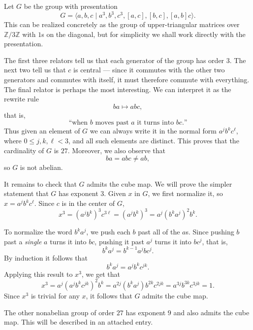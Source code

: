 \documentclass[12pt]{article}
\newcounter{123listctr}
\newcounter{123listcolonstylectr}
\begin{document}
Let $G$ be the group with presentation
\[
  G = \langle a, b, c \mid a^3, b^3, c^3, [a,c], [b,c], [a,b]c \rangle.
\]
This can be realized concretely as the group of upper-triangular
matrices over $\mathbb{Z}/3\mathbb{Z}$ with $1$s on the diagonal, but for
simplicity we shall work directly with the presentation.

The first three relators tell us that each generator of the group has
order $3$.  The next two tell us that $c$ is central --- since it
commutes with the other two generators and commutes with itself, it
must therefore commute with everything.  The final relator is perhaps
the most interesting.  We can interpret it as the rewrite rule
\[
  ba \mapsto abc,
\]
that is,
\[
  \text{``when $b$ moves past $a$ it turns into $bc$.''}
\]
Thus given an element of $G$ we can always write it in the normal form
$a^j b^k c^{\ell}$, where $0\le j, k, \ell<3$, and all such elements
are distinct.  This proves that the cardinality of $G$ is $27$.
Moreover, we also observe that
\[
  ba = abc \ne ab,
\]
so $G$ is not abelian.

It remains to check that $G$ admits the cube map.  We will prove the
simpler statement that $G$ has exponent $3$.  Given $x$ in $G$, we
first normalize it, so $x = a^j b^k c^{\ell}$.  Since $c$ is in the
center of $G$,
\[
  x^3 = (a^j b^k)^3 c^{3\ell} = (a^j b^k)^3 = a^j(b^k a^j)^2b^k.
\]

To normalize the word $b^k a^j$, we push each $b$ past all of the
$a$s.  Since pushing $b$ past a \emph{single} $a$ turns it into $bc$, pushing
it past $a^j$ turns it into $bc^j$, that is,
\[
  b^k a^j = b^{k-1} a^j b c^j.
\]
By induction it follows that
\[
  b^k a^j = a^j b^k c^{jk}.
\]
Applying this result to $x^3$, we get that
\[
  x^3 = a^j(a^j b^k c^{jk})^2 b^k = a^{2j} (b^ka^j) b^{2k} c^{2jk} = a^{3j} b^{3k} c^{3jk} = 1.
\]
Since $x^3$ is trivial for any $x$, it follows that $G$ admits the
cube map.

The other nonabelian group of order $27$ has exponent $9$ and also admits the 
cube map.  This will be %
described in an attached entry.

\end{document}
